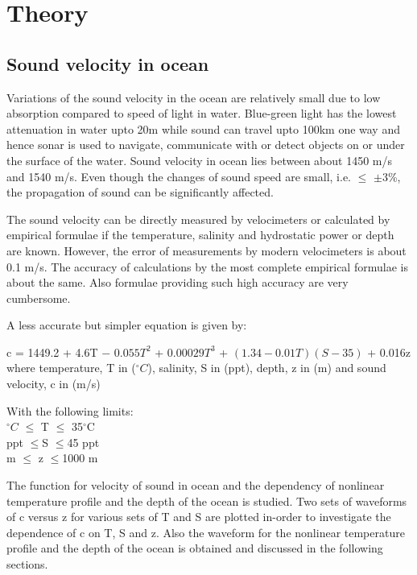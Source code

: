 \chapter*{Theory} \label{Theory}
\section{Sound velocity in ocean} \label{Sound velocity in ocean}
\noindent Variations of the sound velocity in the ocean are relatively small due to low absorption compared to speed of light in water. Blue-green light has the lowest attenuation in water upto 20m while sound can travel upto 100km one way and hence sonar is used to navigate, communicate with or detect objects on or under the surface of the water. Sound velocity in ocean lies between about 1450 m/s and 1540 m/s. Even though the changes of sound speed are small, i.e.  $\leq$ $\pm 3$\%, the propagation of sound can be significantly affected.

\noindent The sound velocity can be directly measured by velocimeters or calculated by empirical formulae if the temperature, salinity and hydrostatic power or depth are known. However, the error of measurements by modern velocimeters is about 0.1 m/s. The accuracy of calculations by the most complete empirical formulae is about the same. Also formulae providing such high accuracy are very cumbersome. 

\noindent A less accurate but simpler equation is given by:

c = 1449.2 + 4.6T $-$ $0.055T^2$ + $0.00029T^3$ + $(1.34 -0.01T) (S-35)$ + 0.016z \\
\noindent where temperature, T in ($^{\circ}C$), salinity, S in (ppt), depth, z in (m) and sound velocity, c in (m/s) 

\noindent With the following limits: \\
$^{\circ}C$   $\leq$ T   $\leq$ 35$^{\circ}$C  \\
 ppt   $\leq$S   $\leq$45 ppt \\
 m   $\leq$ z   $\leq$1000 m

\noindent The function for velocity of sound in ocean and the dependency of nonlinear temperature profile and the depth of the ocean is studied. Two sets of waveforms of c versus z for various sets of T and S are plotted in-order to investigate the dependence of c on T, S and z. Also the waveform for the nonlinear temperature profile and the depth of the ocean is obtained and discussed in the following sections.